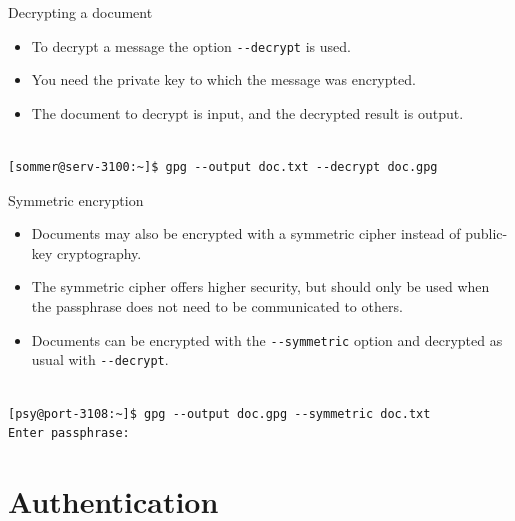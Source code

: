 \documentclass[%
mode=present,%
paper=screen%
]{powerdot}
\newcommand{\clopt}[1]{\texttt{{-}#1}}
\begin{document}
\begin{slide}[method=direct]{Decrypting a document}
  \begin{itemize}
  \item To decrypt a message the option \clopt{-decrypt} is used.
  \item You need the private key to which the message was encrypted.
  \item The document to decrypt is input, and the decrypted result is
    output.
  \end{itemize}
\begin{verbatim}

[sommer@serv-3100:~]$ gpg --output doc.txt --decrypt doc.gpg
\end{verbatim}%
\end{slide}

\begin{slide}[method=direct]{Symmetric encryption}
  \begin{itemize}
  \item Documents may also be encrypted with a symmetric cipher
    instead of public-key cryptography.
  \item The symmetric cipher offers higher security, but should only
    be used when the passphrase does not need to be communicated to
    others.
  \item Documents can be encrypted with the \clopt{-symmetric} option
    and decrypted as usual with \clopt{-decrypt}.
  \end{itemize}
\begin{verbatim}

[psy@port-3108:~]$ gpg --output doc.gpg --symmetric doc.txt
Enter passphrase:
\end{verbatim}%
\end{slide}

\section{Authentication}
\end{document}
